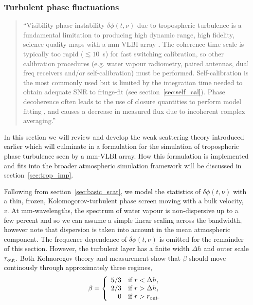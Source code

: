 \subsubsection{Turbulent phase fluctuations}\label{sec:turb_theory}

\begin{quotation}
``Visibility phase instability  $\delta \phi(t,\nu)$ due to tropospheric turbulence is a fundamental limitation to producing high dynamic range, high fidelity, science-quality maps with a mm-VLBI array \citep{Thompson_2001}. The coherence time-scale is typically too rapid ($\lesssim10$~s) for fast switching calibration, so other calibration procedures (e.g. water vapour radiometry, paired antennas, dual freq receivers and/or self-calibration) must be performed. Self-calibration is the most commonly used but is limited by the integration time needed to obtain adequate SNR to fringe-fit (see section~\ref{sec:self_cal}). Phase decoherence often leads to the use of closure quantities to perform model fitting \citep{Doeleman_2001,Bower_2004, Shen_2005}, and causes a decrease in measured flux due to incoherent complex averaging.''\\
\citep{Blecher_2016}
\end{quotation}

In this section we will review and develop the weak scattering theory introduced earlier which will culminate in a formulation for the simulation of tropospheric phase turbulence seen by a mm-VLBI array. How this formulation is implemented and fits into the broader atmospheric simulation framework will be discussed in section~\ref{sec:trop_imp}. 


Following from section~\ref{sec:basic_scat}, we model the statistics of $\delta \phi(t,\nu)$ with a thin, frozen, Kolomogorov-turbulent phase screen moving with a bulk velocity, $v$. At mm-wavelengths, the spectrum of water vapour is non-dispersive up to a few percent \citep{Curtis_2009} and so we can assume a simple linear scaling across the bandwidth, however note that dispersion is taken into account in the mean atmospheric component. The frequence dependence of $\delta \phi(t,\nu)$ is omitted for the remainder of this section.
However, the turbulent layer has a finite width $\Delta h$ and outer scale $r_{\rm out}$. Both Kolmorogov theory and measurement \citep[Fig.~\ref{fig:screentransition},][]{Coulman_1985, Treuhaft_1987, Carilli_1997} show that $\beta$ should move continously through approximately three regimes,
\begin{equation}
 \beta = \left\{
 \begin{array}{rl}
 5/3 & \text{if } r < \Delta h,\\
2/3 & \text{if } r > \Delta h,\\
0 & \text{if } r > r_{\rm out}.
 \end{array} \right.
\end{equation}

